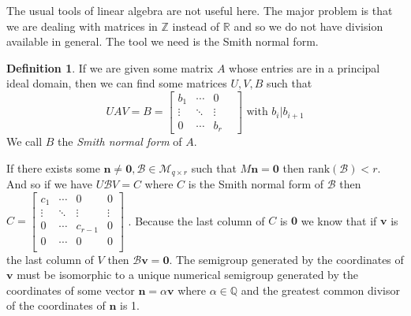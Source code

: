 \documentclass[11pt]{amsart}
\theoremstyle{plain}
\theoremstyle{definition}
\newtheorem{defi}{Definition}
\begin{document}
The usual tools of linear algebra are not useful here. The major problem is that we are dealing with matrices in $\mathbb{Z}$ instead of $\mathbb{R}$ and so we do not have division available in general. The tool we need is the Smith normal form.
\begin{defi}
  If we are given some matrix $A$ whose entries are in a principal ideal domain,
  then we can find some matrices $U,V,B$ such that
\[UAV=B=
\left[\begin{array}{cccc}
  b_1&\cdots&0\\
  \vdots&\ddots&\vdots \\
  0&\cdots&b_r&
\end{array}\right]
\text{ with }b_i|b_{i+1}\]
We call $B$ the \emph{Smith normal form} of $A$.\cite{adkins}
\end{defi}
If there exists some $\mathbf{n}\ne \mathbf{0}, \mathcal{B}\in \mathcal{M}_{q\times r}$ such that $M\mathbf{n}=\mathbf{0}$ then $\text{rank}(\mathcal{B})<r$. And so if we have $U\mathcal{B}V=C$ where $C$ is the Smith normal form of $\mathcal{B}$ then $C=\left[\begin{array}{ccccc}
  c_1&\cdots&0&0\\
  \vdots&\ddots&\vdots&\vdots \\
  0&\cdots&c_{r-1}&0\\
  0&\cdots&0&0\\
\end{array}\right]
$
. Because the last column of $C$ is $\mathbf{0}$ we know that if $\mathbf{v}$ is the last column of $V$ then $\mathcal{B}\mathbf{v}=\mathbf{0}$. The semigroup generated by the coordinates of $\mathbf{v}$ must be isomorphic to a unique numerical semigroup generated by the coordinates of some vector $\mathbf{n}=\alpha\mathbf{v}$ where $\alpha\in \mathbb{Q}$ and the greatest common divisor of the coordinates of $\mathbf{n}$ is 1.
\end{document}
